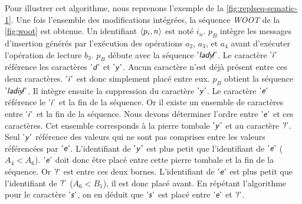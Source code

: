 Pour illustrer cet algorithme, nous reprenons l'exemple de la \autoref{fig:replseq-sematic-1}.
Une fois l'ensemble des modifications intégrées, la séquence \emph{WOOT} de la \autoref{fig:woot} est obtenue.
Un identifiant $\tuple*{p_i, n}$ est noté $i_n$.
$p_B$ intègre les messages d'insertion générés par l'exécution des opérations $a_2$, $a_3$, et $a_4$ avant d'exécuter l'opération de lecture $b_3$.
$p_B$ débute avec la séquence $\textsf{'\textit{lady\negthinspace!}'}$.
Le caractère $\textsf{'\textit{i}'}$ référence les caractères $\textsf{'\textit{d}'}$ et $\textsf{'\textit{y}'}$.
Aucun caractère n'est déjà présent entre ces deux caractères.
$\textsf{'\textit{i}'}$ est donc simplement placé entre eux.
$p_B$ obtient la séquence $\textsf{'\textit{ladiy\negthinspace!}'}$.
Il intègre ensuite la suppression du caractère $\textsf{'\textit{y}'}$.
Le caractère $\textsf{'\textit{e}'}$ référence le $\textsf{'\textit{i}'}$ et la fin de la séquence.
Or il existe un ensemble de caractères entre $\textsf{'\textit{i}'}$ et la fin de la séquence.
Nous devons déterminer l'ordre entre $\textsf{'\textit{e}'}$ et ces caractères.
Cet ensemble corresponds à la pierre tombale $\textsf{'\textit{y}'}$ et au caractère $\textsf{'\textit{\negthinspace!}'}$.
Seul $\textsf{'\textit{y}'}$ référence des valeurs qui ne sont pas comprises entre les valeurs référencées par $\textsf{'\textit{e}'}$.
L'identifiant de $\textsf{'\textit{y}'}$ est plus petit que l'identifiant de $\textsf{'\textit{e}'}$ ($A_4 < A_6$).
$\textsf{'\textit{e}'}$ doit donc être placé entre cette pierre tombale et la fin de la séquence.
Or $\textsf{'\textit{\negthinspace!}'}$ est entre ces deux bornes.
L'identifiant de $\textsf{'\textit{e}'}$ est plus petit que l'identifiant de $\textsf{'\textit{\negthinspace!}'}$ ($A_6 < B_1$), il est donc placé avant.
En répétant l'algorithme pour le caractère $\textsf{'\textit{s}'}$, on en déduit que $\textsf{'\textit{s}'}$ est placé entre $\textsf{'\textit{e}'}$ et $\textsf{'\textit{\negthinspace!}'}$.


